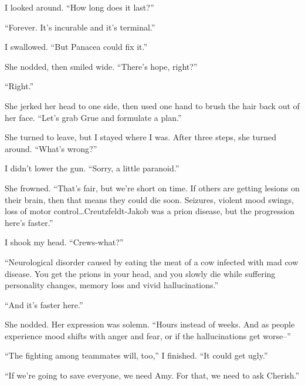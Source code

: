 I looked around.  ``How long does it last?''



``Forever.  It's incurable and it's terminal.''



I swallowed.  ``But Panacea could fix it.''



She nodded, then smiled wide.  ``There's hope, right?''



``Right.''



She jerked her head to one side, then used one hand to brush the hair back out of her face.  ``Let's grab Grue and formulate a plan.''



She turned to leave, but I stayed where I was.  After three steps, she turned around.  ``What's wrong?''



I didn't lower the gun.  ``Sorry, a little paranoid.''



She frowned.  ``That's fair, but we're short on time.  If others are getting lesions on their brain, then that means they could die soon.  Seizures, violent mood swings, loss of motor control\ldots  Creutzfeldt-Jakob was a prion disease, but the progression here's faster.''



I shook my head.  ``Crews-what?''



``Neurological disorder caused by eating the meat of a cow infected with mad cow disease.  You get the prions in your head, and you slowly die while suffering personality changes, memory loss and vivid hallucinations.''



``And it's faster here.''



She nodded.  Her expression was solemn.  ``Hours instead of weeks.  And as people experience mood shifts with anger and fear, or if the hallucinations get worse--''



``The fighting among teammates will, too,'' I finished.  ``It could get ugly.''



``If we're going to save everyone, we need Amy.  For that, we need to ask Cherish.''



